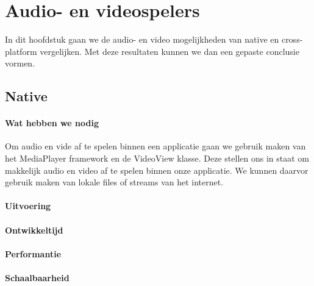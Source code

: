 
\chapter{Audio- en videospelers}%
\label{ch:audioenvideo}

In dit hoofdstuk gaan we de audio- en video mogelijkheden van native en cross-platform vergelijken. 
Met deze resultaten kunnen we dan een gepaste conclusie vormen.

\section{Native}
\subsubsection{Wat hebben we nodig}
Om audio en vide af te spelen binnen een applicatie gaan we gebruik maken van het MediaPlayer 
framework en de VideoView klasse. Deze stellen ons in staat om makkelijk audio en video af te spelen binnen 
onze applicatie. We kunnen daarvor gebruik maken van lokale files of streams van het internet.

\subsubsection{Uitvoering}



\subsubsection{Ontwikkeltijd}



\subsubsection{Performantie}



\subsubsection{Schaalbaarheid}





